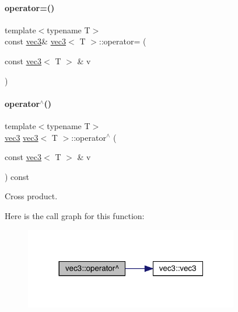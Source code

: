 \mbox{\label{structvec3_ad2cd7d64d02aa394c736ccc7054e5411}} 
\paragraph{\texorpdfstring{operator=()}{operator=()}}
{\footnotesize\ttfamily template$<$typename T$>$ \\
const \mbox{\hyperlink{structvec3}{vec3}}\& \mbox{\hyperlink{structvec3}{vec3}}$<$ T $>$\+::operator= (\begin{DoxyParamCaption}\item[{const \mbox{\hyperlink{structvec3}{vec3}}$<$ T $>$ \&}]{v }\end{DoxyParamCaption})\hspace{0.3cm}{\ttfamily [inline]}}

\mbox{\label{structvec3_a6469fdfd7c378f5f30e299bc2e1e776a}} 
\paragraph{\texorpdfstring{operator$^\wedge$()}{operator^()}}
{\footnotesize\ttfamily template$<$typename T$>$ \\
\mbox{\hyperlink{structvec3}{vec3}} \mbox{\hyperlink{structvec3}{vec3}}$<$ T $>$\+::operator$^\wedge$ (\begin{DoxyParamCaption}\item[{const \mbox{\hyperlink{structvec3}{vec3}}$<$ T $>$ \&}]{v }\end{DoxyParamCaption}) const\hspace{0.3cm}{\ttfamily [inline]}}



Cross product. 

Here is the call graph for this function\+:\nopagebreak
\begin{figure}[H]
\begin{center}
\leavevmode
\includegraphics[width=264pt]{structvec3_a6469fdfd7c378f5f30e299bc2e1e776a_cgraph}
\end{center}
\end{figure}
\mbox{\label{structvec3_afd43645a0cc5c449ae4b98f6d93774d2}} 
